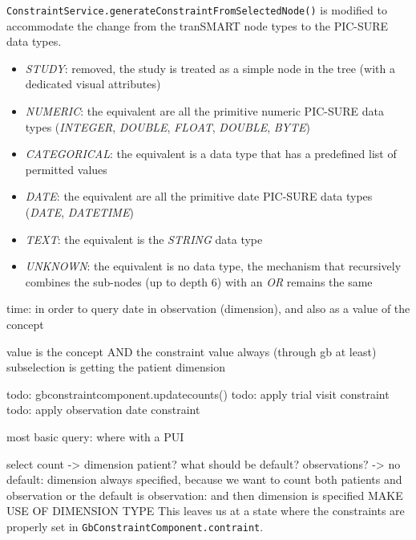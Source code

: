 \verb|ConstraintService.generateConstraintFromSelectedNode()| is modified to accommodate the change from the tranSMART node types to the PIC-SURE data types.
\begin{itemize}
    \item \emph{STUDY}: removed, the study is treated as a simple node in the tree (with a dedicated visual attributes)
    \item \emph{NUMERIC}: the equivalent are all the primitive numeric PIC-SURE data types (\emph{INTEGER}, \emph{DOUBLE}, \emph{FLOAT}, \emph{DOUBLE}, \emph{BYTE})
    \item \emph{CATEGORICAL}: the equivalent is a data type that has a predefined list of permitted values
    \item \emph{DATE}: the equivalent are all the primitive date PIC-SURE data types (\emph{DATE}, \emph{DATETIME})
    \item \emph{TEXT}: the equivalent is the \emph{STRING} data type
    \item \emph{UNKNOWN}: the equivalent is no data type, the mechanism that recursively combines the sub-nodes (up to depth 6) with an \emph{OR} remains the same
\end{itemize}

% 



time: in order to query date in observation (dimension), and also as a value of the concept


value is the concept AND the constraint value always (through gb at least)
subselection is getting the patient dimension

todo: gbconstraintcomponent.updatecounts()
todo: apply trial visit constraint
todo: apply observation date constraint

most basic query: where with a PUI

select count 
-> dimension patient? what should be default? observations? 
-> no default: dimension always specified, because we want to count both patients and observation 
or the default is observation: and then dimension is specified 
MAKE USE OF DIMENSION TYPE
This leaves us at a state where the constraints are properly set in \verb|GbConstraintComponent.contraint|.


